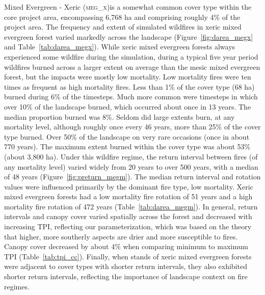 Mixed Evergreen - Xeric (\textsc{meg\_x})is a somewhat common cover type within the core project area, encompassing 6,768 ha and comprising roughly 4\% of the project area. The frequency and extent of simulated wildfires in xeric mixed evergreen forest varied markedly across the landscape (Figure~\ref{fig:darea_megx} and Table~\ref{tab:darea_megx}). %
%
While xeric mixed evergreen forests always experienced some wildfire during the simulation, during a typical five year period wildfires burned across a larger extent on average than the mesic mixed evergreen forest, but the impacts were mostly low mortality. Low mortality fires were ten times as frequent as high mortality fires. Less than 1\% of the cover type (68 ha) burned during 6\% of the timesteps. Much more common were timesteps in which over 10\% of the landscape burned, which occurred about once in 13 years. The median proportion burned was 8\%. Seldom did large extents burn, at any mortality level, although roughly once every 46 years, more than 25\% of the cover type burned. Over 50\% of the landscape on very rare occasions (once in about 770 years). The maximum extent burned within the cover type was about 53\% (about 3,800 ha). %
%
Under this wildfire regime, the return interval between fires (of any mortality level) varied widely from 20 years to over 500 years, with a median of 48 years (Figure~\ref{fig:preturn_megm}). The median return interval and rotation values were influenced primarily by the dominant fire type, low mortality. Xeric mixed evergreen forests had a low mortality fire rotation of 51 years and a high mortality fire rotation of 472 years (Table~\ref{tab:darea_megm}).  %
%
In general, return intervals and canopy cover varied spatially across the forest and decreased with increasing TPI, reflecting our parameterization, which was based on the theory that higher, more southerly aspects are drier and more susceptible to fires. Canopy cover decreased by about 4\% when comparing minimum to maximum TPI (Table~\ref{tab:tpi_cc}).  %
%
Finally, when stands of xeric mixed evergreen forests were adjacent to cover types with shorter return intervals, they also exhibited shorter return intervals, reflecting the importance of landscape context on fire regimes.

